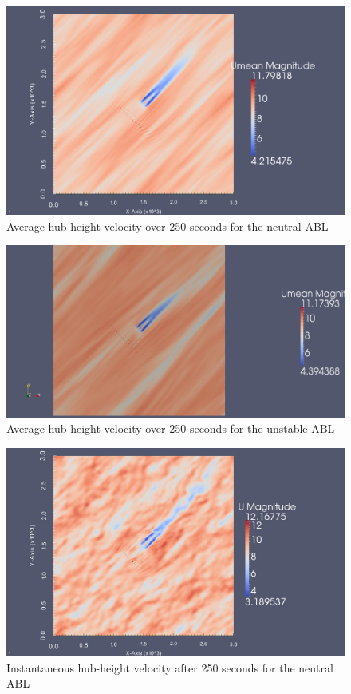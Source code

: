\begin{figure}
\centering
\includegraphics[width=\textwidth]{images/neutralWindPlantAvgVelPlan}
\caption{Average hub-height velocity over 250 seconds for the neutral ABL}
\label{fig:neutralWindPlantAvgVelPlan}
\end{figure}

\begin{figure}
\centering
\includegraphics[width=\textwidth]{images/unstableWindPlantAvgVelPlan}
\caption{Average hub-height velocity over 250 seconds for the unstable ABL}
\label{fig:unstableWindPlantAvgVelPlan}
\end{figure}

\begin{figure}
\centering
\includegraphics[width=\textwidth]{images/neutralWindPlant250sVelPlan}
\caption{Instantaneous hub-height velocity after 250 seconds for the neutral ABL}
\label{fig:neutralWindPlant250sVelPlan}
\end{figure}

